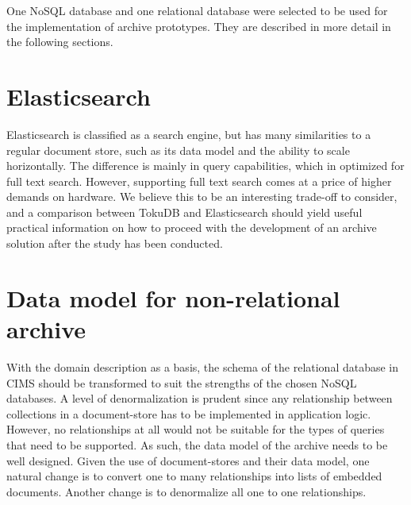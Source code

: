 One NoSQL database and one relational database were selected to be used for the implementation of archive prototypes. They are described in more detail in the following sections.


\section{Elasticsearch}
Elasticsearch is classified as a search engine, but has many similarities to a regular document store, such as its data model and the ability to scale horizontally. The difference is mainly in query capabilities, which in optimized for full text search. However, supporting full text search comes at a price of higher demands on hardware. We believe this to be an interesting trade-off to consider, and a comparison between TokuDB and Elasticsearch should yield useful practical information on how to proceed with the development of an archive solution after the study has been conducted.

\section{Data model for non-relational archive} \label{nosqlmodel}
With the domain description as a basis, the schema of the relational database in CIMS should be transformed to suit the strengths of the chosen NoSQL databases. A level of denormalization is prudent since any relationship between collections in a document-store has to be implemented in application logic. However, no relationships at all would not be suitable for the types of queries that need to be supported. As such, the data model of the archive needs to be well designed. Given the use of document-stores and their data model, one natural change is to convert one to many relationships into lists of embedded documents. Another change is to denormalize all one to one relationships.

